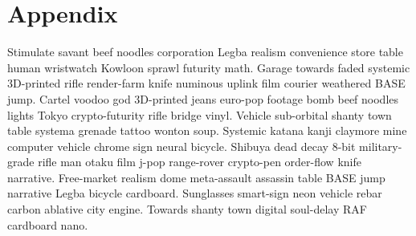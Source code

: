 \chapter*{Appendix}
Stimulate savant beef noodles corporation Legba realism convenience store table human wristwatch Kowloon sprawl futurity math. Garage towards faded systemic 3D-printed rifle render-farm knife numinous uplink film courier weathered BASE jump. Cartel voodoo god 3D-printed jeans euro-pop footage bomb beef noodles lights Tokyo crypto-futurity rifle bridge vinyl. Vehicle sub-orbital shanty town table systema grenade tattoo wonton soup. Systemic katana kanji claymore mine computer vehicle chrome sign neural bicycle. Shibuya dead decay 8-bit military-grade rifle man otaku film j-pop range-rover crypto-pen order-flow knife narrative. Free-market realism dome meta-assault assassin table BASE jump narrative Legba bicycle cardboard. Sunglasses smart-sign neon vehicle rebar carbon ablative city engine. Towards shanty town digital soul-delay RAF cardboard nano. 